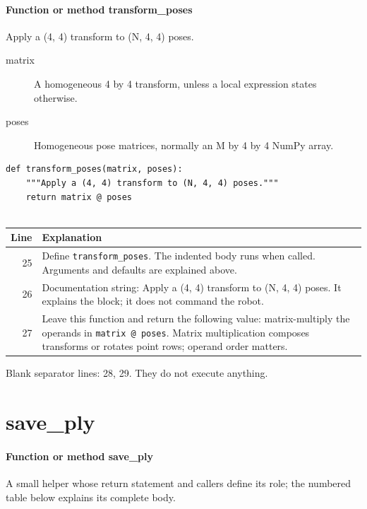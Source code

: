 \documentclass[11pt,a4paper]{book}
\begin{document}
\paragraph{Function or method transform\_poses}
Apply a (4, 4) transform to (N, 4, 4) poses.

\begin{description}
\item[matrix] A homogeneous 4 by 4 transform, unless a local expression states otherwise.
\item[poses] Homogeneous pose matrices, normally an M by 4 by 4 NumPy array.
\end{description}

\begin{lstlisting}[firstnumber=25]
def transform_poses(matrix, poses):
    """Apply a (4, 4) transform to (N, 4, 4) poses."""
    return matrix @ poses


\end{lstlisting}

\begin{longtable}{r p{}}

\textbf{Line} & \textbf{Explanation} \\ \hline \endhead

25 & Define \texttt{transform\_poses}. The indented body runs when called. Arguments and defaults are explained above. \\

26 & Documentation string: Apply a (4, 4) transform to (N, 4, 4) poses. It explains the block; it does not command the robot. \\

27 & Leave this function and return the following value: matrix-multiply the operands in \texttt{matrix @ poses}. Matrix multiplication composes transforms or rotates point rows; operand order matters. \\

\end{longtable}

Blank separator lines: 28, 29. They do not execute anything.

\section{save\_ply}

\paragraph{Function or method save\_ply}
A small helper whose return statement and callers define its role; the numbered table below explains its complete body.
\end{document}
